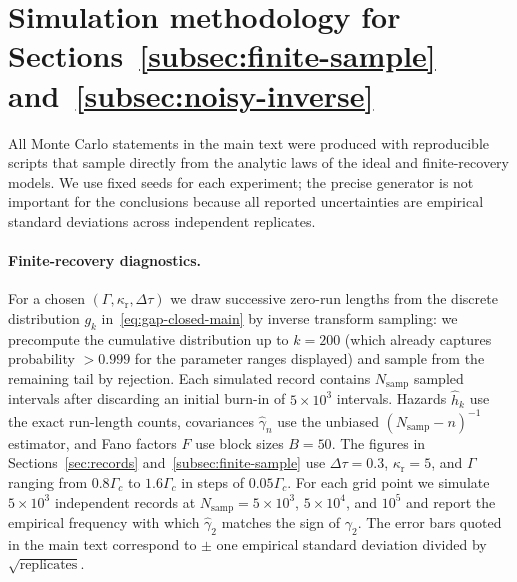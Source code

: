 \section{Simulation methodology for Sections~\ref{subsec:finite-sample} and~\ref{subsec:noisy-inverse}}\label{app:monte}

All Monte Carlo statements in the main text were produced with reproducible scripts that sample directly from the analytic laws of the ideal and finite-recovery models. We use fixed seeds for each experiment; the precise generator is not important for the conclusions because all reported uncertainties are empirical standard deviations across independent replicates.

\paragraph{Finite-recovery diagnostics.} For a chosen $(\Gamma,\kappa_{\mathrm r},\Delta\tau)$ we draw successive zero-run lengths from the discrete distribution $g_k$ in~\eqref{eq:gap-closed-main} by inverse transform sampling: we precompute the cumulative distribution up to $k=200$ (which already captures probability $>0.999$ for the parameter ranges displayed) and sample from the remaining tail by rejection. Each simulated record contains $N_{\mathrm{samp}}$ sampled intervals after discarding an initial burn-in of $5\times10^3$ intervals. Hazards $\widehat h_k$ use the exact run-length counts, covariances $\widehat\gamma_n$ use the unbiased $(N_{\mathrm{samp}}-n)^{-1}$ estimator, and Fano factors $\widehat F$ use block sizes $B=50$. The figures in Sections~\ref{sec:records} and~\ref{subsec:finite-sample} use $\Delta\tau=0.3$, $\kappa_{\mathrm r}=5$, and $\Gamma$ ranging from $0.8\Gamma_c$ to $1.6\Gamma_c$ in steps of $0.05\Gamma_c$. For each grid point we simulate $5\times10^3$ independent records at $N_{\mathrm{samp}}=5\times10^3$, $5\times10^4$, and $10^5$ and report the empirical frequency with which $\widehat\gamma_2$ matches the sign of $\gamma_2$. The error bars quoted in the main text correspond to $\pm$ one empirical standard deviation divided by $\sqrt{\text{replicates}}$.

